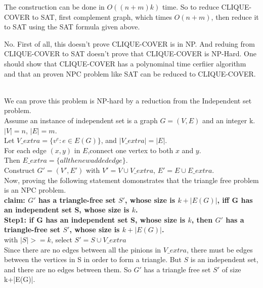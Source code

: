 \documentclass[12pt,a4paper]{article}
\newcommand{\question}[1]{\bigskip\noindent{\textbf{Q{#1} solution}}}
\begin{document}
The construction can be done in $O((n+m)k)$ time. So to reduce CLIQUE-COVER to SAT, first complement graph, which times $O(n + m)$, then reduce it to SAT using the SAT formula given above.


\question{32.B}

No. First of all, this doesn't prove CLIQUE-COVER is in NP. And reduing from CLIQUE-COVER to SAT doesn't prove that CLIQUE-COVER is NP-Hard. One should show that CLIQUE-COVER has a polynominal time cerfiier algorithm and that an proven NPC problem like SAT can be reduced to CLIQUE-COVER.

\question{33}\\
We can prove this problem is NP-hard by a reduction from the Independent set problem.\\
Assume an instance of independent set is a graph $G=(V,E)$ and an integer k. $|V| = n$, $|E| = m$.\\
Let $V\_extra = \{v^e:e \in E(G)\}$, and $|V\_extra|=|E|$. \\
For each edge $(x,y)$ in $E$,connect one vertex to both $x$ and $y$.\\
Then $E\_extra = \{all the new added edge\}$.\\
Construct $G' = (V',E')$ with $V' = V \cup V\_extra$, $E'= E \cup E\_extra $.\\
Now, proving the following statement domonstrates that the triangle free problem is an NPC problem.\\
\textbf{claim: $G'$ has a triangle-free set $S'$, whose size is $k+|E(G)|$, iff G has an independent set S, whose size is  $k$.}\\
\textbf{Step1: if G has an independent set S, whose size is $k$, then $G'$ has a triangle-free set $S'$, whose size is $k+|E(G)|$.}\\
with $|S| >= k$, select $S' = S \cup V\_extra$\\
Since there are no edges between all the pinions in $V\_extra$, there must be edges between the vertices in S in order to form a triangle. But $S$ is an independent set, and there are no edges between them. So $G'$ has a triangle free set $S'$ of size k+|E(G)|.\\
\end{document}
